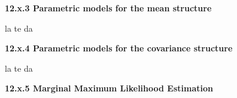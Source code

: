 \documentclass[12pt, titlepage]{article}
\begin{document}
{\large \flushleft \textbf{12.x.3 Parametric models for the mean structure}}

la te da


{\large \flushleft \textbf{12.x.4 Parametric models for the covariance structure}}

la te da


\vspace{.5cm}
{\large \flushleft \textbf{12.x.5 Marginal Maximum Likelihood Estimation}}
\vspace{.5cm}
\end{document}
